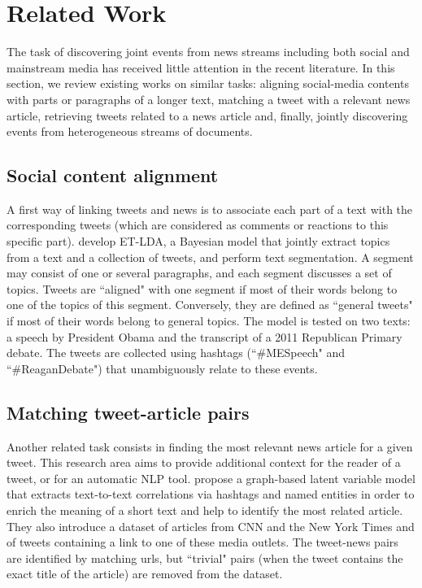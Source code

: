 \section{Related Work}

The task of discovering joint events from news streams including both social and mainstream media has received little attention in the recent literature. In this section, we review existing works on similar tasks: aligning social-media contents with parts or paragraphs of a longer text, matching a tweet with a relevant news article, retrieving tweets related to a news article and, finally, jointly discovering events from heterogeneous streams of documents.

\subsection{Social content alignment}
\label{Social content alignment}
A first way of linking tweets and news is to associate each part of a text with the corresponding tweets (which are considered as comments or reactions to this specific part). \cite{hu_et-lda:_2012} develop ET-LDA, a Bayesian model that jointly extract topics from a text and a collection of tweets, and perform text segmentation. A segment may consist of one or several paragraphs, and each segment discusses a set of topics. Tweets are ``aligned" with one segment if most of their words belong to one of the topics of this segment. Conversely, they are defined as ``general tweets" if most of their words belong to general topics. The model is tested on two texts: a speech by President Obama and the transcript of a 2011 Republican Primary debate. The tweets are collected using hashtags (``\#MESpeech" and ``\#ReaganDebate") that unambiguously relate to these events. 

\subsection{Matching tweet-article pairs}
\label{Matching tweet-article pairs}
Another related task consists in finding the most relevant news article for a given tweet. This research area aims to provide additional context for the reader of a tweet, or for an automatic NLP tool. \cite{guo_linking_2013} propose a graph-based latent variable model that extracts text-to-text correlations via hashtags and named entities in order to enrich the meaning of a short text and help to identify the most related article. They also introduce a dataset of articles from CNN and the New York Times and of tweets containing a link to one of these media outlets. The tweet-news pairs are identified by matching urls, but ``trivial" pairs (when the tweet contains the exact title of the article) are removed from the dataset.

